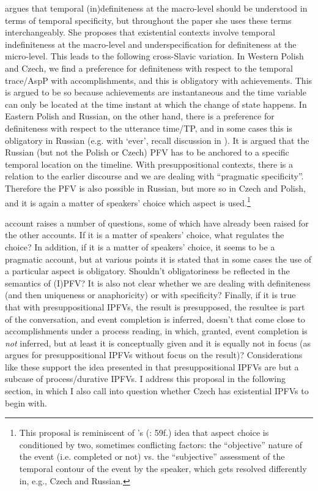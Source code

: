 \documentclass[output=paper,colorlinks,citecolor=brown]{langscibook}
\begin{document}
\citet{klimek22} argues that temporal (in)definiteness at the macro-level should be understood in terms of temporal specificity, but throughout the paper she uses these terms interchangeably. She proposes that %
existential contexts involve %
temporal indefiniteness at the macro-level and underspecification for definiteness at the micro-level. This leads to the following cross-Slavic variation. In Western Polish and Czech, we find a preference for definiteness with respect to the temporal trace/AspP with accomplishments, and this is obligatory with achievements. This is argued to be so because achievements are instantaneous and the time variable can only be located at the time instant at which the change of state happens. In Eastern Polish and Russian, on the other hand, there is a preference for definiteness with respect to the utterance time/TP, and in some cases this is obligatory in Russian (e.g. with `ever', recall discussion in ). It is argued that the Russian (but not the Polish or Czech) PFV has to be anchored to a specific temporal location on the timeline. With presuppositional contexts, there is a relation to the earlier discourse and we are dealing with ``pragmatic specificity''. Therefore the PFV is also possible in Russian, but more so in Czech and Polish, and it is again a matter of speakers' choice which aspect is used.\footnote{This proposal is reminiscent of \citeauthor{petruxina00}'s (\citeyear{petruxina00}: 59f.) idea that aspect choice is conditioned by two, sometimes conflicting factors: the ``objective'' nature of the event (i.e. completed or not) vs. the ``subjective'' assessment of the temporal contour of the event by the speaker, which gets resolved differently in, e.g., Czech and Russian.} 

 account raises a number of questions, some of which have already been raised for the other accounts. If it is a matter of speakers' choice, what regulates the choice? In addition, if it is a matter of speakers' choice, it seems to be a pragmatic account, but at various points it is stated that in some cases the use of a particular aspect is obligatory. Shouldn't obligatoriness be reflected in the semantics of (I)PFV? It is also not clear whether we are dealing with definiteness (and then uniqueness or anaphoricity) or with specificity? Finally, if it is true that with presuppositional IPFVs, the result is presupposed, the resultee is part of the conversation, and event completion is inferred, doesn't that come close to accomplishments under a process reading, in which, granted, event completion is \textit{not} inferred, but at least it is conceptually given and it is equally not in focus (as \citeauthor{klimek22} argues for presuppositional IPFVs without focus on the result)? Considerations like these support the idea presented in \citet{gehrke22} that presuppositional IPFVs are but a subcase of process/durative IPFVs. I address this proposal in the following section, in which I also call into question whether Czech has existential IPFVs to begin with.
\end{document}

